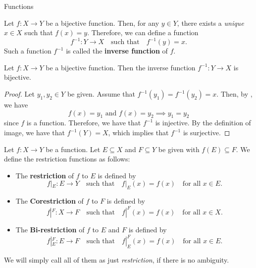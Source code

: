 \begin{section}{Functions}
\bigskip

\begin{definition} \label{def:InverseFunction}
    Let $f: X \to Y$ be a bijective function. Then, for any $y \in Y$, there exists a
    \emph{unique} $x \in X$ such that $f(x) = y$. Therefore, we can define a function
    \[
    f^{-1}: Y \to X \quad \text{such that} \quad f^{-1}(y) = x.
    \]
    Such a function $f^{-1}$ is called the \textbf{inverse function} of $f$.
\end{definition}

\bigskip

\begin{theorem} \label{thm:InverseFunctionIsBijective}
    Let $f: X \to Y$ be a bijective function. Then the inverse function $f^{-1}: Y \to X$ is bijective.
\end{theorem}

\begin{proof}
    Let $y_1, y_2 \in Y$ be given. Assume that $f^{-1}(y_1) = f^{-1}(y_2) = x$. Then, by ,
    we have
    \[
    f(x) = y_1 \text{ and } f(x) = y_2 \implies y_1 = y_2
    \]
    since $f$ is a function. Therefore, we have that $f^{-1}$ is injective.
    By the definition of image, we have that $f^{-1}(Y) = X$, which implies that $f^{-1}$ is surjective.
\end{proof}

\bigskip

\begin{definition} \label{def:RestrictionFunction}
    Let $f: X \to Y$ be a function. Let $E \subseteq X$ and $F \subseteq Y$ be given with $f(E) \subseteq F$.
    We define the restriction functions as follows:
    \begin{itemize}
        \item The \textbf{restriction} of $f$ to $E$ is defined by
        \[
        f|_{E}: E \to Y \quad \text{such that} \quad f|_{E}(x) = f(x) \quad \text{for all } x \in E.
        \]
        \item The \textbf{Corestriction} of $f$ to $F$ is defined by
        \[
        f|^{F}: X \to F \quad \text{such that} \quad f|^{F}(x) = f(x) \quad \text{for all } x \in X.
        \]
        \item The \textbf{Bi-restriction} of $f$ to $E$ and $F$ is defined by
        \[
        f|_{E}^{F}: E \to F \quad \text{such that} \quad f|_{E}^{F}(x) = f(x) \quad \text{for all } x \in E.
        \]
    \end{itemize}
    We will simply call all of them as just \emph{restriction}, if there is no ambiguity.
\end{definition}


\end{section}
